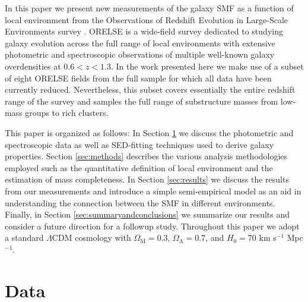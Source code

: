 \documentclass[a4paper,fleqn,usenatbib]{mnras}
\begin{document}
In this paper we present new measurements of the galaxy SMF as a function of local environment from the Observations of Redshift Evolution in Large-Scale Environments survey \citep[ORELSE][]{Lubin2009}.
ORELSE is a wide-field survey dedicated to studying galaxy evolution across the full range of local environments with extensive photometric and spectroscopic observations of multiple well-known galaxy overdensities at $0.6 < z < 1.3$.
In the work presented here we make use of a subset of eight ORELSE fields from the full sample for which all data have been currently reduced.
Nevertheless, this subset covers essentially the entire redshift range of the survey and samples the full range of substructure masses from low-mass groups to rich clusters.


This paper is organized as follows:
In Section \ref{sec:data} we discuss the photometric and spectroscopic data as well as SED-fitting techniques used to derive galaxy properties.
Section \ref{sec:methods} describes the various analysis methodologies employed such as the quantitative definition of local environment and the estimation of mass completeness.
In Section \ref{sec:results} we discuss the results from our measurements and introduce a simple semi-empirical model as an aid in understanding the connection between the SMF in different environments.
Finally, in Section \ref{sec:summaryandconclusions} we summarize our results and consider a future direction for a followup study.
Throughout this paper we adopt a standard $\Lambda$CDM cosmology with $\Omega_{\mathrm{M}} = 0.3$, $\Omega_{\mathrm{\Lambda}} = 0.7$, and $H_0 = 70$ km s$^{-1}$ Mpc$^{-1}$.




\section{Data}
\label{sec:data}
\end{document}
